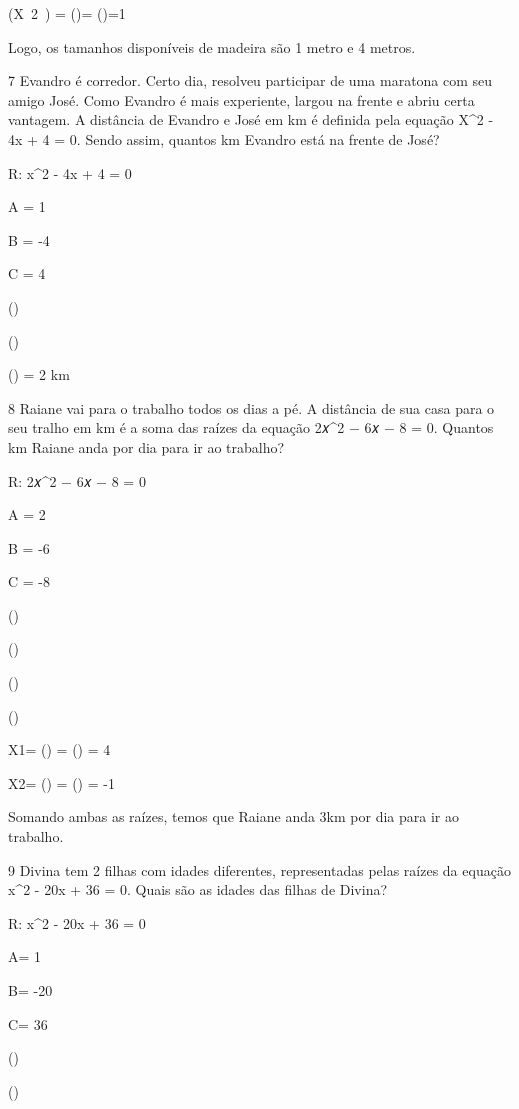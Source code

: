 {(X~2~) = ()= ()=1

Logo, os tamanhos disponíveis de madeira são 1 metro e 4 metros.

\num{7} Evandro é corredor. Certo dia, resolveu participar de uma maratona
com seu amigo José. Como Evandro é mais experiente, largou na frente e
abriu certa vantagem. A distância de Evandro e José em km é definida
pela equação X^2 - 4x + 4 = 0. Sendo assim, quantos km Evandro está na
frente de José?

R: x^2 - 4x + 4 = 0

A = 1

B = -4

C = 4

()

()

() = 2 km

\num{8} Raiane vai para o trabalho todos os dias a pé. A distância de sua
casa para o seu tralho em km é a soma das raízes da equação 2𝑥^2 − 6𝑥 − 8
= 0. Quantos km Raiane anda por dia para ir ao trabalho?

R: 2𝑥^2 − 6𝑥 − 8 = 0

A = 2

B = -6

C = -8

()

()

()

()

X1= () = () = 4

X2= () = () = -1

Somando ambas as raízes, temos que Raiane anda 3km por dia para ir ao
trabalho.

\num{9} Divina tem 2 filhas com idades diferentes, representadas pelas raízes
da equação x^2 - 20x + 36 = 0. Quais são as idades das filhas de Divina?

R: x^2 - 20x + 36 = 0

A= 1

B= -20

C= 36

()

()

}
